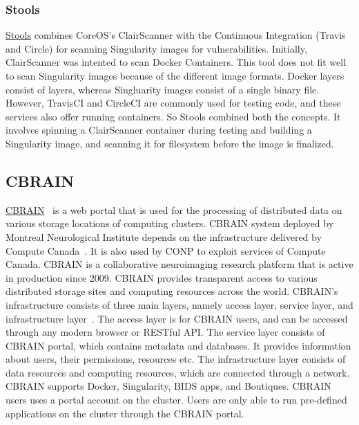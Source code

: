 \documentclass[a4paper,num-refs]{oup-contemporary}
\begin{document}
\subsubsection{Stools}

\href{https://github.com/singularityhub/stools}{Stools} combines CoreOS's ClairScanner with the Continuous Integration (Travis and
Circle) for scanning Singularity images for vulnerabilities.
Initially, ClairScanner was intented to scan Docker Containers. This tool does not fit well
to scan Singularity images because of the different image formats. Docker layers
consist of layers, whereas Singluarity images consist of a single binary file.
However, TravisCI and CircleCI are commonly used for testing code, and these
services also offer running containers. So Stools combined both the concepts.
It involves spinning a ClairScanner container during testing and building a
Singularity image, and scanning it for filesystem before the image is finalized.

\subsection{CBRAIN}

\href{http://github.com/aces/cbrain}{CBRAIN}~\cite{sherif2014cbrain} is a web portal that is
used for the processing of distributed data on various storage locations of computing
clusters. CBRAIN system deployed by Montreal Neurological Institute depends on the infrastructure
delivered by Compute Canada~\cite{das2016mni}.
It is also used by CONP to exploit services of Compute Canada. CBRAIN is a collaborative
neuroimaging research platform that is active in production since 2009. CBRAIN
provides transparent access to various distributed storage sites and computing
resources across the world. CBRAIN’s infrastructure consists of three main
layers, namely access layer, service layer, and infrastructure layer~\cite{sherif2014cbrain}. The access
layer is for CBRAIN users, and can be accessed through any modern browser or
RESTful API. The service layer consists of CBRAIN portal, which contains
metadata and databases. It provides information about users, their permissions,
resources etc. The infrastructure layer consists of data resources and computing
resources, which are connected through a network. 
CBRAIN supports Docker, Singularity, BIDS apps, and Boutiques.
CBRAIN users uses a portal
account on the cluster. Users are only able to
run pre-defined applications on the cluster through the CBRAIN portal.

%

\end{document}
